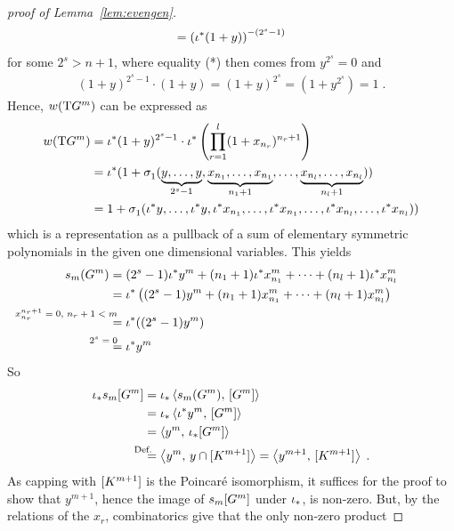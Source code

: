 \begin{proof}[proof of
  Lemma~\ref{lem:evengen}]
\begin{align*}
      = \left({{\iota}}^*(1+y)\right)^{-(2^s-1)}
  \end{align*}
  for some $2^s>n+1$, where equality (*) then comes from $y^{2^s}=0$ and
  \begin{gather*}
    (1+y)^{2^s-1} \cdot (1+y)
    = (1+y)^{2^s}
    = (1+y^{2^s})
    = 1
    \;.
  \end{gather*}
  Hence, ${w}(\mathrm{T}G^{m})$ can be expressed as
  \begin{align*}
    {w}(\mathrm{T}G^{m})
    &= {{\iota}}^*(1+y)^{2^s-1}
      \cdot {{\iota}}^*\left(
      \prod_{r=1}^{l}(1+x_{n_r})^{n_r+1}
      \right) \\
    &= {{\iota}}^*(1 + \sigma_{1}^{}(
      \underbrace{y,\dotsc,y}_{2^s-1},
      \underbrace{x_{n_1},\dotsc,x_{n_1}}_{n_1+1},
      \dotsc,
      \underbrace{x_{n_{l}},\dotsc,x_{n_{l}}}_{n_{l}+1}
      )) \\
    &= 1 + \sigma_{1}^{}(
      {{\iota}}^* y,\dotsc,{{\iota}}^* y,
      {{\iota}}^* x_{n_1},\dotsc, {{\iota}}^* x_{n_1},
      \dotsc,
      {{\iota}}^* x_{n_l},\dotsc, {{\iota}}^* x_{n_l}
      ))
  \end{align*}
  which is a representation as a pullback of a sum of elementary
  symmetric polynomials in the given one dimensional variables.
  This yields
  \begin{align*}
    \s{m}(\G m)
    &= (2^s-1) \pb\emb y^m
      + (n_1+1) \pb\emb x_{n_1}^m
      + \dotsb
      + (n_l+1)\pb\emb x_{n_l}^m
    \\
    &= \pb\emb\left(
      (2^s-1)y^m
      + (n_1+1)x_{n_1}^m
      + \dotsb
      + (n_l+1)x_{n_l}^m
      \right) \\
    &\equalsby{$x_{n_r}^{n_r+1}=0$, $n_r+1<m$}
      \pb\emb((2^s-1)y^m) \\
    &\equalsby{$2^s=0$}
      \pb\emb y^m
  \end{align*}
  So
  \begin{align*}
    \pf\emb\snum{m}{\G m}
    &= \pf\emb\capped{\s{m}(\G m)}{\fundcl{\G m}} \\
    &= \pf\emb\capped{\pb\emb y^m}{\fundcl{\G m}} \\
    &= \capped{y^m}{\pf\emb\fundcl{\G m}} \\
    &\equalsby{Def.} \capped{y^m}{y\cap\fundcl{K^{m+1}}}
      = \capped{y^{m+1}}{\fundcl{K^{m+1}}}
      \;.
  \end{align*}
  As capping with $[K^{m+1}]$ is the Poincaré isomorphism, it
  suffices for the proof to show that $y^{m+1}$, hence the image of
  $s_{m}[G^{m}]$ under ${{\iota}}_*$, is non-zero. But, by the relations
  of the $x_r$, combinatorics give that the only non-zero product

\end{proof}

